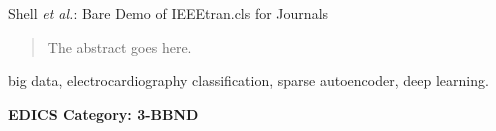 \documentclass[journal]{IEEEtran}
\begin{document}
%
{Shell \MakeLowercase{\textit{et al.}}: Bare Demo of IEEEtran.cls for Journals}
% 











\maketitle

\begin{abstract}
The abstract goes here.


\end{abstract}

\begin{IEEEkeywords}
big data, electrocardiography classification, sparse autoencoder, deep learning.
\end{IEEEkeywords}






 \ifCLASSOPTIONpeerreview
 \begin{center} \bfseries EDICS Category: 3-BBND \end{center}
 \fi
%
\IEEEpeerreviewmaketitle
\end{document}
